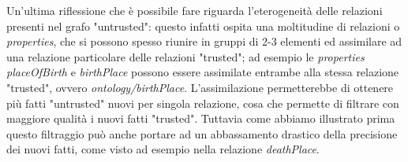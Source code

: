 \documentclass[10pt,a4paper,twocolumn]{article}
\begin{document}
Un'ultima riflessione che è possibile fare riguarda l'eterogeneità delle relazioni presenti nel grafo "untrusted": questo infatti ospita una moltitudine di relazioni o \textit{properties}, che si possono spesso riunire in gruppi di 2-3 elementi ed assimilare ad una relazione particolare delle relazioni "trusted"; ad esempio le \textit{properties} \textit{placeOfBirth} e \textit{birthPlace} possono essere assimilate entrambe alla stessa relazione "trusted", ovvero \textit{ontology/birthPlace}. L'assimilazione permetterebbe di ottenere più fatti "untrusted" nuovi per singola relazione, cosa che permette di filtrare con maggiore qualità i nuovi fatti "trusted". Tuttavia come abbiamo illustrato prima questo filtraggio può anche portare ad un abbassamento drastico della precisione dei nuovi fatti, come visto ad esempio nella relazione \textit{deathPlace}.
\end{document}

